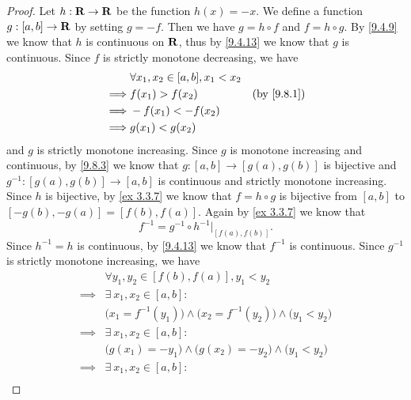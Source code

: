 \begin{proof}
  Let \(h : \mathbf{R} \to \mathbf{R}\) be the function \(h(x) = -x\).
  We define a function \(g : [a, b] \to \mathbf{R}\) by setting \(g = -f\).
  Then we have \(g = h \circ f\) and \(f = h \circ g\).
  By \cref{9.4.9} we know that \(h\) is continuous on \(\mathbf{R}\), thus by \cref{9.4.13} we know that \(g\) is continuous.
  Since \(f\) is strictly monotone decreasing, we have
  \begin{align*}
             & \forall x_1, x_2 \in [a, b], x_1 < x_2                            \\
    \implies & f(x_1) > f(x_2)                        & \text{(by \cref{9.8.1})} \\
    \implies & -f(x_1) < -f(x_2)                                                 \\
    \implies & g(x_1) < g(x_2)
  \end{align*}
  and \(g\) is strictly monotone increasing.
  Since \(g\) is monotone increasing and continuous, by \cref{9.8.3} we know that \(g : [a, b] \to [g(a), g(b)]\) is bijective and \(g^{-1} : [g(a), g(b)] \to [a, b]\) is continuous and strictly monotone increasing.
  Since \(h\) is bijective, by \cref{ex 3.3.7} we know that \(f = h \circ g\) is bijective from \([a, b]\) to \([-g(b), -g(a)] = [f(b), f(a)]\).
  Again by \cref{ex 3.3.7} we know that
  \[
    f^{-1} = g^{-1} \circ h^{-1}|_{[f(a), f(b)]}.
  \]
  Since \(h^{-1} = h\) is continuous, by \cref{9.4.13} we know that \(f^{-1}\) is continuous.
  Since \(g^{-1}\) is strictly monotone increasing, we have
  \begin{align*}
             & \forall y_1, y_2 \in [f(b), f(a)], y_1 < y_2                                                                       \\
    \implies & \exists\ x_1, x_2 \in [a, b] :                                                                                     \\
             & \big(x_1 = f^{-1}(y_1)\big) \land \big(x_2 = f^{-1}(y_2)\big) \land \big(y_1 < y_2\big)                            \\
    \implies & \exists\ x_1, x_2 \in [a, b] :                                                                                     \\
             & \big(g(x_1) = -y_1\big) \land \big(g(x_2) = -y_2\big) \land \big(y_1 < y_2\big)                                    \\
    \implies & \exists\ x_1, x_2 \in [a, b] :                                                                                     \\

\end{align*}
\end{proof}
